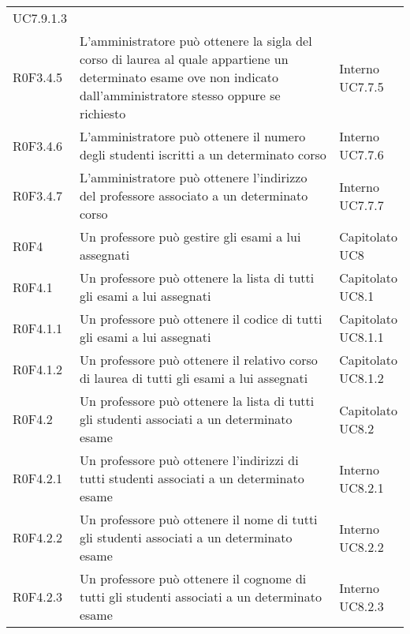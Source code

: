 \documentclass[AnalisiDeiRequisiti.tex]{subfiles}
\begin{document}
\begin{longtable}[H]{p{2cm}p{5.2cm}p{5cm}}
{		UC7.9.1.3 \\
	} \\
	R0F3.4.5 & L'amministratore può ottenere la sigla del corso di laurea al quale appartiene un determinato esame ove non indicato dall'amministratore stesso oppure se richiesto & \makecell[tl]{
		Interno	 \\ 
		UC7.7.5
	} \\
	R0F3.4.6 & L'amministratore può ottenere il numero degli studenti iscritti a un determinato corso  & \makecell[tl]{
		Interno	 \\ 
		UC7.7.6
	} \\
	R0F3.4.7 & L'amministratore può ottenere l'indirizzo del professore associato a un determinato corso  & \makecell[tl]{
		Interno	 \\ 
		UC7.7.7
	} \\
	R0F4 & Un professore può gestire gli esami a lui assegnati & \makecell[tl]{
		Capitolato \\ 
		UC8
	} \\
	R0F4.1 & Un professore può ottenere la lista di tutti gli esami a lui assegnati & \makecell[tl]{
		Capitolato \\ 
		UC8.1
	} \\
	R0F4.1.1 & Un professore può ottenere il codice di tutti gli esami a lui assegnati & \makecell[tl]{
		Capitolato \\ 
		UC8.1.1
	} \\
	R0F4.1.2 & Un professore può ottenere il relativo corso di laurea di tutti gli esami a lui assegnati& \makecell[tl]{
		Capitolato \\ 
		UC8.1.2
	} \\
	R0F4.2 & Un professore può ottenere la lista di tutti gli studenti associati a un determinato esame & \makecell[tl]{
		Capitolato  \\ 
		UC8.2
	} \\
	R0F4.2.1 & Un professore può ottenere l'indirizzi di tutti studenti associati a un determinato esame & \makecell[tl]{
		Interno  \\ 
		UC8.2.1
	} \\
	R0F4.2.2 & Un professore può ottenere il nome di tutti gli studenti associati a un determinato esame & \makecell[tl]{
		Interno  \\ 
		UC8.2.2
	} \\
	R0F4.2.3 & Un professore può ottenere il cognome di tutti gli studenti associati a un determinato esame & \makecell[tl]{
		Interno  \\ 
		UC8.2.3
	} \\

\end{longtable}
\end{document}
